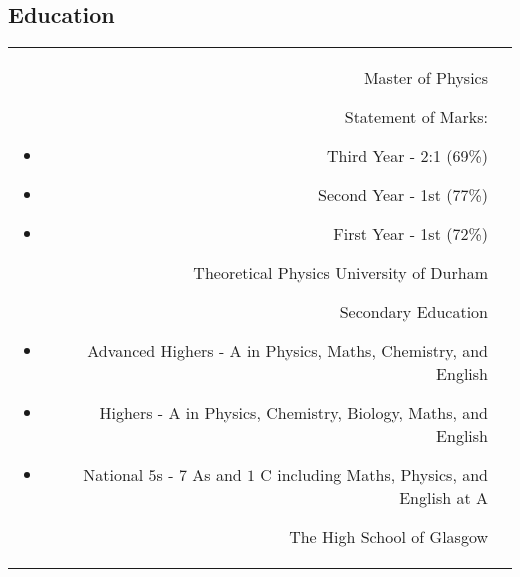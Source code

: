 \documentclass[10pt]{article} %
\begin{document}
\begin{paracol}{2}

\section{Education} 





\begin{supertabular}{rp{6.7cm}} %

	
	{Master of Physics} %
    {Statement of Marks:
        \begin{itemize}[noitemsep]
        \item Third Year - 2:1 (69\%)
        \item Second Year - 1st (77\%)
        \item First Year - 1st (72\%)
    \end{itemize}\vspace{-10pt}} %
	{Theoretical Physics} %
	{University of Durham} %
	
	
	{Secondary Education} %
	{} %
    {\vspace{-5pt}
     \begin{itemize}[noitemsep]
        \item Advanced Highers - A in Physics, Maths, Chemistry, and English
        \item Highers - A in Physics, Chemistry, Biology, Maths, and English
        \item National $5$s - $7$ As and $1$ C including Maths, Physics, and English at A
     \end{itemize}\vspace{-10pt}} %
     {The High School of Glasgow} %
	

\end{supertabular}
\end{paracol}
\end{document}
